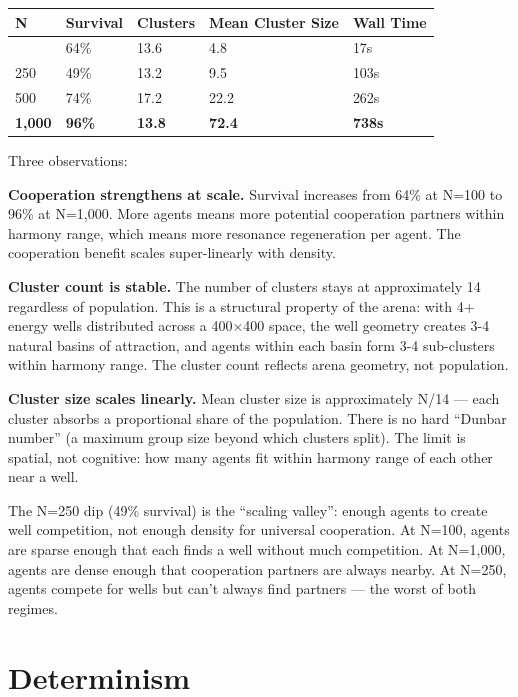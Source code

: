 \begin{longtable}[]{@{}lllll@{}}
\toprule\noalign{}
N & Survival & Clusters & Mean Cluster Size & Wall Time \\
\midrule\noalign{}
\endhead
\bottomrule\noalign{}
\endlastfoot
100 & 64\% & 13.6 & 4.8 & 17s \\
250 & 49\% & 13.2 & 9.5 & 103s \\
500 & 74\% & 17.2 & 22.2 & 262s \\
\textbf{1,000} & \textbf{96\%} & \textbf{13.8} & \textbf{72.4} & \textbf{738s} \\
\end{longtable}

Three observations:

\textbf{Cooperation strengthens at scale.} Survival increases from 64\% at N=100 to 96\% at N=1,000. More agents means more potential cooperation partners within harmony range, which means more resonance regeneration per agent. The cooperation benefit scales super-linearly with density.

\textbf{Cluster count is stable.} The number of clusters stays at approximately 14 regardless of population. This is a structural property of the arena: with 4+ energy wells distributed across a 400$\times$400 space, the well geometry creates 3-4 natural basins of attraction, and agents within each basin form 3-4 sub-clusters within harmony range. The cluster count reflects arena geometry, not population.

\textbf{Cluster size scales linearly.} Mean cluster size is approximately N/14 --- each cluster absorbs a proportional share of the population. There is no hard ``Dunbar number'' (a maximum group size beyond which clusters split). The limit is spatial, not cognitive: how many agents fit within harmony range of each other near a well.

The N=250 dip (49\% survival) is the ``scaling valley'': enough agents to create well competition, not enough density for universal cooperation. At N=100, agents are sparse enough that each finds a well without much competition. At N=1,000, agents are dense enough that cooperation partners are always nearby. At N=250, agents compete for wells but can't always find partners --- the worst of both regimes.

\section{Determinism}\label{determinism}

